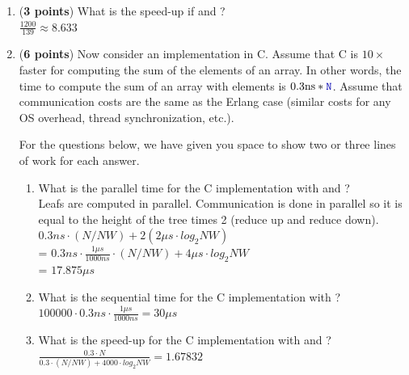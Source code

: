 \documentclass{article}
\newenvironment{answer}
{\color{blue}}
{\normalfont}
\begin{document}
\begin{enumerate}
\begin{enumerate}
      \begin{answer}
        $\frac{3 \cdot N}{3\cdot(N/NW) + 4000 \cdot log_2NW}$
      \end{answer}
      \item (\textbf{3 points}) What is the speed-up if  and ? \\
      \begin{answer}
        $\frac{1200}{139} \approx 8.633$
      \end{answer}
      \item (\textbf{6 points})
	Now consider an implementation in C.
	Assume that C is $10\times$ faster for computing the sum of the elements of an array.
	In other words, the time to compute the sum of an array with  elements
	is $0.3\mathrm{ns} * \code{N}$.
	Assume that communication costs are the same as the Erlang case (similar costs
	for any OS overhead, thread synchronization, etc.).
	\par
	For the questions below, we have given you space to show two or three
	lines of work for each answer.
	\begin{enumerate}
	  \item What is the parallel  time for the C implementation
	    with  and ? \\
    \begin{answer}
    Leafs are computed in parallel. Communication is done in parallel so it is equal to the height of the tree times 2 (reduce up and reduce down). \\
      $0.3ns \cdot(N/NW) + 2(2\mu s \cdot log_2NW)$ \\
      =  $0.3ns \cdot \frac{1 \mu s}{1000 ns} \cdot(N/NW) + 4\mu s \cdot log_2NW$ \\
      = $17.875 \mu s$
    \end{answer}
	  \item What is the sequential time for the C implementation
	    with ? \\
    \begin{answer}
      $100000 \cdot 0.3ns \cdot \frac{1\mu s}{1000ns}=30 \mu s$
    \end{answer}
	  \item What is the speed-up for the C implementation
	    with  and ? \\
    \begin{answer}
      $\frac{0.3 \cdot N}{0.3\cdot(N/NW) + 4000 \cdot log_2NW} = 1.67832$
    \end{answer}

\end{enumerate}
\end{enumerate}
\end{enumerate}
\end{document}
